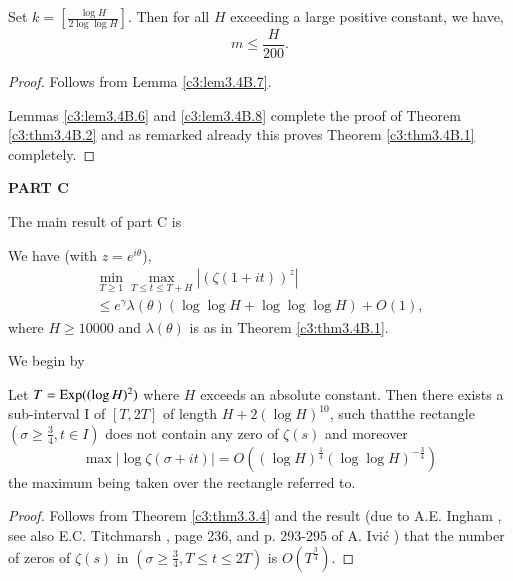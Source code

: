 \begin{alphlemma}\label{c3:lem3.4B.8}
Set $k = \left[\frac{\log H}{2 \log \log H} \right]$. Then for all $H$ exceeding a large positive constant, we have,
$$
m \leq \frac{H}{200}. 
$$
\end{alphlemma}

\begin{proof}
Follows from Lemma \ref{c3:lem3.4B.7}.

Lemmas \ref{c3:lem3.4B.6} and \ref{c3:lem3.4B.8} complete the proof of Theorem \ref{c3:thm3.4B.2} and as remarked already this proves Theorem \ref{c3:thm3.4B.1} completely.
\end{proof}

\begin{center}
\textbf{PART C}
\end{center}

The main result of part C is


\setcounter{alphtheorem}{0}
\setcounter{npart}{3}
\begin{alphtheorem}\label{c3:thm3.4C.1}
We have (with $z=e^{i\theta}$),
\begin{gather*}
\min\limits_{T \geq 1} \max\limits_{T \leq t \leq T + H} |(\zeta(1+ it))^z| \\
\leq e^\gamma \lambda (\theta) (\log \log H + \log \log \log H) + O(1), \tag{3.4C.1}\label{c3:eq3.4C.1}
\end{gather*}
where $H \geq 10000$ and $\lambda (\theta)$ is as in Theorem \ref{c3:thm3.4B.1}. 
\end{alphtheorem}

We begin by

\setcounter{alphlemma}{0}
\begin{alphlemma}\label{c3:lem3.4C.1}
Let $T =\operatorname{Exp} ((\log H)^2)$ where $H$ exceeds an absolute constant. Then there exists a sub-interval I of $[T, 2T]$ of length $H + 2(\log H)^{10}$, such that\pageoriginale the rectangle  $(\sigma \geq \frac{3}{4}, t \in I )$ does not contain any zero of $\zeta(s)$ and moreover
\begin{equation*}
\max |\log \zeta(\sigma + it)| = O((\log H)^{\frac{1}{4}} (\log \log H)^{-\frac{3}{4}})  \tag{3.4C.2}\label{c3:eq3.4C.2}
\end{equation*}
the maximum being taken over the rectangle referred to.
\end{alphlemma}

\begin{proof}
Follows from Theorem \ref{c3:thm3.3.4} and the result (due to A.E. Ingham \cite{Ingham1}, see also E.C. Titchmarsh \cite{Titchmarsh1}, page 236, and p. 293-295 of A. Ivi\'c \cite{Ivic1}) that the number of zeros of $\zeta(s)$ in $(\sigma \geq \frac{3}{4}, T \leq t \leq 2T)$ is $O(T^{\frac{3}{4}})$. 
\end{proof}

